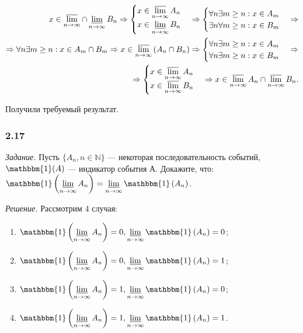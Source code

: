 \begin{enumerate}[label=\alph*)]
\begin{equation*}
\begin{split}
x \in \varlimsup \limits_{ n \to \infty } \cap \varliminf \limits_{n \to \infty } B_n \Rightarrow
\begin{cases}
x \in \varlimsup \limits_{ n \to \infty } A_n \\
x \in \varliminf \limits_{n \to \infty } B_n
\end{cases}
\Rightarrow
\begin{cases}
\forall n \exists m \geq n : x \in A_m \\
\exists n \forall m \geq n : x \in B_m
\end{cases}
\Rightarrow \\
\Rightarrow \forall n \exists m \geq n : x \in A_m \cap B_m \Rightarrow
x \in \varlimsup \limits_{n \to \infty } \left( A_n \cap B_n \right) \Rightarrow
\begin{cases}
\forall n \exists m \geq n : x \in A_m \\
\forall n \exists m \geq n : x \in B_m
\end{cases}
\Rightarrow \\
\Rightarrow
\begin{cases}
x \in \varlimsup \limits_{n \to \infty } A_n \\
x \in \varlimsup \limits_{n \to \infty } B_n
\end{cases}
\Rightarrow
x \in \varlimsup \limits_{n \to \infty } A_n \cap \varlimsup \limits_{n \to \infty } B_n.
\end{split}
\end{equation*}

Получили требуемый результат.

\subsubsection*{2.17}

\textit{Задание.} Пусть $ \{ A_n , n \in \mathbb{N} \} $ --- некоторая последовательность событий,
$ \mathbbm{1} ( A ) $ --- индикатор события А.
Докажите, что:
$ \mathbbm{1} \left( \varliminf \limits_{n\to\infty} A_n \right) = \varliminf \limits_{n\to\infty} \mathbbm{1} \left( A_n \right) $.

\textit{Решение.} Рассмотрим 4 случая:
\begin{enumerate}
\item $\mathbbm{1}\left(\varliminf\limits_{n\to\infty}A_n\right)=0, \varliminf\limits_{n\to\infty}\mathbbm{1}\left(A_n\right)=0$;
\item $\mathbbm{1}\left(\varliminf\limits_{n\to\infty}A_n\right)=0, \varliminf\limits_{n\to\infty}\mathbbm{1}\left(A_n\right)=1$;
\item $\mathbbm{1}\left(\varliminf\limits_{n\to\infty}A_n\right)=1, \varliminf\limits_{n\to\infty}\mathbbm{1}\left(A_n\right)=0$;
\item $\mathbbm{1}\left(\varliminf\limits_{n\to\infty}A_n\right)=1, \varliminf\limits_{n\to\infty}\mathbbm{1}\left(A_n\right)=1$.
\end{enumerate}


\end{enumerate}
